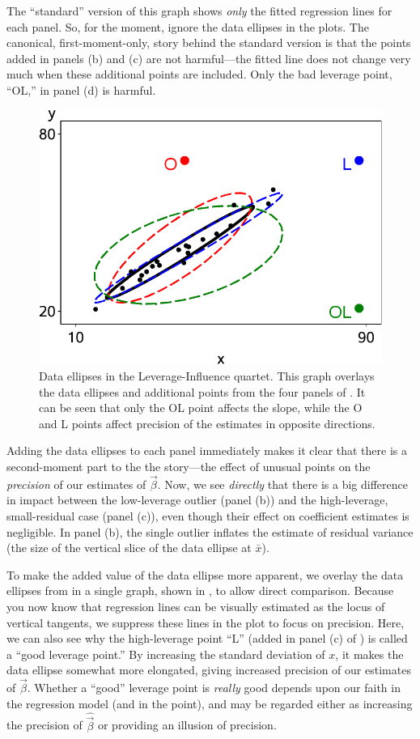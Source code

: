 The ``standard'' version of this graph shows \emph{only} the fitted regression lines for each
panel. So, for the moment, ignore the data ellipses in the plots.
The canonical, first-moment-only, story behind the standard version is that the points added in panels
(b) and (c) are not harmful---the fitted line does not change very much when these
additional points are included. Only the bad leverage point, ``OL,'' in panel (d) is harmful.

\begin{figure}[htb!]
  \centering
  \includegraphics[width=.5\textwidth,clip]{fig/levdemo22}
  \caption{Data ellipses in the Leverage-Influence quartet. This graph overlays the data ellipses
  and additional points from the four panels of . It can be seen that only the
  OL point affects the slope, while the O and L points affect precision of the estimates in opposite
  directions.}%
  \label{fig:levdemo22}
\end{figure}

Adding the data ellipses to each panel immediately makes it clear that there is a second-moment
part to the the story---the effect of unusual points on the \emph{precision} of our estimates
of $\vec{\beta}$.  Now,
we see \emph{directly} that there is a big difference in impact between
the low-leverage outlier (panel (b)) and the high-leverage, small-residual case (panel (c)),
even though their effect on coefficient estimates is negligible.
In panel (b), the single outlier inflates the estimate of residual variance (the size of the
vertical slice of the data ellipse at $\bar{x}$).

To make the added value of the data ellipse more apparent, we overlay the data ellipses from
 in a single graph, shown in
, to allow direct comparison.  Because you now know that regression lines
can be visually estimated as the locus of vertical tangents, we suppress these lines in the
plot to focus on precision.  Here, we can also see why the high-leverage
point ``L'' (added in panel (c) of ) is called a ``good leverage point.''
By increasing the standard deviation of $x$, it makes the data ellipse somewhat more elongated,
giving increased precision of our estimates of $\vec{\beta}$. Whether a ``good'' leverage point is \emph{really} good depends upon our faith in the regression model (and in the point), and may be regarded either as increasing the precision of $\hat{\vec{\beta}}$ or providing an illusion of precision.

